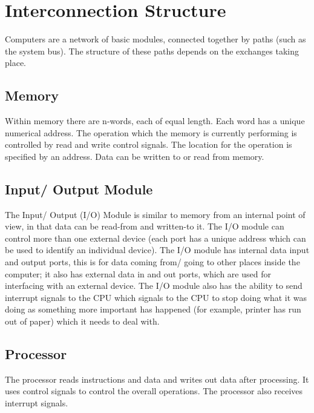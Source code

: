 
\section{Interconnection Structure}
Computers are a network of basic modules, connected together by paths (such as the system bus). The structure of these paths depends on the exchanges taking place.

\subsection{Memory}
Within memory there are n-words, each of equal length. Each word has a unique numerical address. The operation which the memory is currently performing is controlled by read and write control signals. The location for the operation is specified by an address. Data can be written to or read from memory.

\subsection{Input/ Output Module}
The Input/ Output (I/O) Module is similar to memory from an internal point of view, in that data can be read-from and written-to it. The I/O module can control more than one external device (each port has a unique address which can be used to identify an individual device). The I/O module has internal data input and output ports, this is for data coming from/ going to other places inside the computer; it also has external data in and out ports, which are used for interfacing with an external device. The I/O module also has the ability to send interrupt signals to the CPU which signals to the CPU to stop doing what it was doing as something more important has happened (for example, printer has run out of paper) which it needs to deal with.

\subsection{Processor}
The processor reads instructions and data and writes out data after processing. It uses control signals to control the overall operations. The processor also receives interrupt signals.


